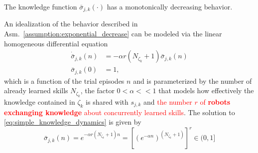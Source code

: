 \begin{tcolorbox}
	\begin{assumption}\label{assumption:exponential_decrease} The knowledge function $\bar{\sigma}_{j,k}(\cdot)$ has a monotonically decreasing behavior.
	\end{assumption}
\end{tcolorbox} 
\noindent
An idealization of the behavior described in Asm.~\ref{assumption:exponential_decrease} can be modeled via the linear homogeneous differential equation
\begin{subequations}\label{eq:simple_knowledge_dynamics}
	\begin{alignat}{2}
		\dot{\bar{\sigma}}_{j,k}\left(n\right) &= -\alpha r \left(N_{\zeta_k} + 1\right) \bar{\sigma}_{j,k}\left(n\right)\\
		\bar{\sigma}_{j,k}\left(0\right) &= 1,
	\end{alignat}
\end{subequations}
which is a function of the trial episodes $n$ and is parameterized by the number of already learned skills $N_{\zeta_k}$, the factor $ 0<\alpha<<1$ that models how effectively the knowledge contained in $\mathcal{\zeta}_k$ is shared with $s_{j,k}$ and \textcolor{red}{the number $r$ of \textbf{robots exchanging knowledge} about concurrently learned skills}. The solution to \eqref{eq:simple_knowledge_dynamics} is given by
\begin{equation}\label{eq:knowledge_exponential_form}
     \boxed{\bar{\sigma}_{j,k}(n) = e^{-\alpha  r \left(N_{\zeta_k}+1\right) n} = \left[ \left(e^{-\alpha n}\right) ^{\left(N_{\zeta_k}+1\right)}\right]^r \in (0,1]}
\end{equation}

